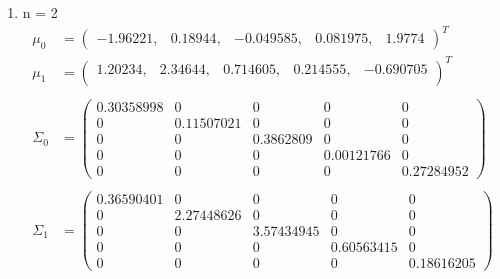 \documentclass[12pt]{article}
\begin{document}
\begin{enumerate}[leftmargin=*]
    \medskip
    \item n = 2
    \begin{align*}
        \mu_0 &= \begin{pmatrix}
            -1.96221, & 0.18944, & -0.049585, & 0.081975, & 1.9774
        \end{pmatrix}^T \\
        \mu_1 &= \begin{pmatrix}
            1.20234, & 2.34644, & 0.714605, & 0.214555, & -0.690705 \\
        \end{pmatrix}^T \\ \\
        \Sigma_0 &= \begin{pmatrix}
            0.30358998 & 0 & 0 & 0 & 0 \\
            0 & 0.11507021 & 0 & 0 & 0 \\
            0 & 0 & 0.3862809 & 0 & 0 \\
            0 & 0 & 0 & 0.00121766 & 0 \\
            0 & 0 & 0 & 0 & 0.27284952 
        \end{pmatrix} \\ \\
        \Sigma_1 &= \begin{pmatrix}
            0.36590401 & 0 & 0 & 0 & 0 \\
            0 & 2.27448626 & 0 & 0 & 0 \\
            0 & 0 & 3.57434945 & 0 & 0 \\
            0 & 0 & 0 & 0.60563415 & 0 \\
            0 & 0 & 0 & 0 & 0.18616205
        \end{pmatrix}
    \end{align*}


\end{enumerate}
\end{document}
